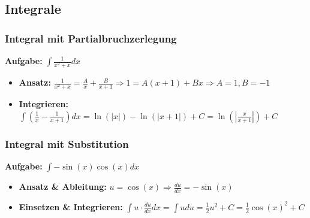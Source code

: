 
\subsection{Integrale}

\subsubsection{Integral mit Partialbruchzerlegung}
\textbf{Aufgabe:} $\int\frac{1}{x^{2}+x}dx$
\begin{itemize}
    \item \textbf{Ansatz:} $\frac{1}{x^2+x} = \frac{A}{x}+\frac{B}{x+1} \Rightarrow 1 = A(x+1) + Bx \Rightarrow A=1, B=-1$
    \item \textbf{Integrieren:} $\int(\frac{1}{x}-\frac{1}{x+1})dx = \ln(|x|)-\ln(|x+1|)+C = \ln\left(\left|\frac{x}{x+1}\right|\right)+C$
\end{itemize}

\subsubsection{Integral mit Substitution}
\textbf{Aufgabe:} $\int -\sin(x)\cos(x)dx$
\begin{itemize}
    \item \textbf{Ansatz \& Ableitung:} $u=\cos(x) \Rightarrow \frac{du}{dx}=-\sin(x)$
    \item \textbf{Einsetzen \& Integrieren:} $\int u \cdot \frac{du}{dx} dx = \int u du = \frac{1}{2}u^2+C = \frac{1}{2}\cos(x)^2+C$
\end{itemize}
